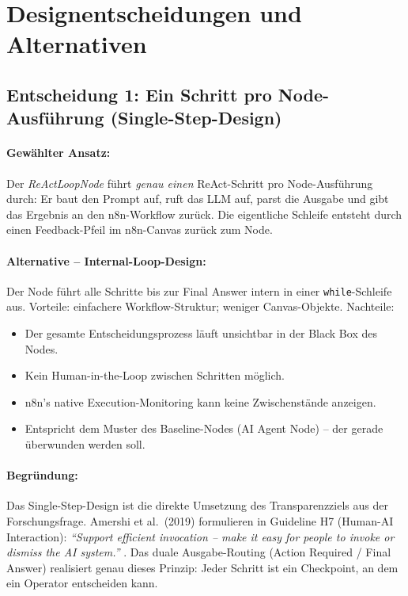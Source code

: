 \documentclass[12pt,a4paper,oneside]{report}
\begin{document}
\section{Designentscheidungen und Alternativen}

\subsection{Entscheidung 1: Ein Schritt pro Node-Ausführung (Single-Step-Design)}

\paragraph{Gewählter Ansatz:}
Der \textit{ReActLoopNode} führt \emph{genau einen} ReAct-Schritt pro Node-Ausführung
durch: Er baut den Prompt auf, ruft das \ac{LLM} auf, parst die Ausgabe und gibt das
Ergebnis an den n8n-Workflow zurück. Die eigentliche Schleife entsteht durch einen
Feedback-Pfeil im n8n-Canvas zurück zum Node.

\paragraph{Alternative -- Internal-Loop-Design:}
Der Node führt alle Schritte bis zur Final Answer intern in einer \texttt{while}-Schleife
aus. Vorteile: einfachere Workflow-Struktur; weniger Canvas-Objekte. Nachteile:
\begin{itemize}
  \item Der gesamte Entscheidungsprozess läuft unsichtbar in der Black Box des Nodes.
  \item Kein Human-in-the-Loop zwischen Schritten möglich.
  \item n8n's native Execution-Monitoring kann keine Zwischen\-stände anzeigen.
  \item Entspricht dem Muster des Baseline-Nodes (AI Agent Node) -- der gerade
    überwunden werden soll.
\end{itemize}

\paragraph{Begründung:}
Das Single-Step-Design ist die direkte Umsetzung des Transparenzziels aus der
Forschungsfrage. Amershi et al.\ (2019) formulieren in Guideline H7 (Human-AI
Interaction): \textit{``Support efficient invocation -- make it easy for people
to invoke or dismiss the AI system.''} \cite{amershi2019guidelines}. Das duale
Ausgabe-Routing (Action Required / Final Answer) realisiert genau dieses Prinzip:
Jeder Schritt ist ein Checkpoint, an dem ein Operator entscheiden kann.
\end{document}
